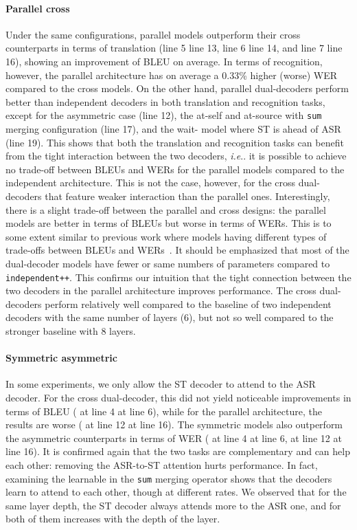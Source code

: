 \documentclass[11pt]{article}
\makeatletter
\DeclareRobustCommand\onedot{\futurelet\@let@token\@onedot}
\def\@onedot{\ifx\@let@token.\else.\null\fi\xspace}
\def\ie{\emph{i.e}\onedot} \def\Ie{\emph{I.e}\onedot}
\theoremstyle{plain}
\theoremstyle{definition}
\newcommand{\var}[1]{\texttt{#1}}
\makeatother
\begin{document}
\paragraph{Parallel \vs cross} Under the same configurations, parallel models outperform their cross counterparts in terms of translation (line 5 \vs line 13, line 6 \vs line 14, and line 7 \vs line 16), showing an improvement of  BLEU on average. In terms of recognition, however, the parallel architecture has on average a 0.33\% higher (worse) WER compared to the cross models. On the other hand, parallel dual-decoders perform better than independent decoders in both translation and recognition tasks, except for the asymmetric case (line 12), the at-self and at-source with \var{sum} merging configuration (line 17), and the wait- model where ST is ahead of ASR (line 19). This shows that both the translation and recognition tasks can benefit from the tight interaction between the two decoders, \ie it is possible to achieve no trade-off between BLEUs and WERs for the parallel models compared to the independent architecture. This is not the case, however, for the cross dual-decoders that feature weaker interaction than the parallel ones. Interestingly, there is a slight trade-off between the parallel and cross designs: the parallel models are better in terms of BLEUs but worse in terms of WERs. This is to some extent similar to previous work where models having different types of trade-offs between BLEUs and WERs~\cite{he2011word,sperber2020consistent,chuang2020worse}. It should be emphasized that most of the dual-decoder models have fewer or same numbers of parameters compared to \var{independent++}. This confirms our intuition that the tight connection between the two decoders in the parallel architecture improves performance. The cross dual-decoders perform relatively well compared to the baseline of two independent decoders with the same number of layers (6), but not so well compared to the 
stronger baseline with 8 layers.

\paragraph{Symmetric \vs asymmetric}
In some experiments, we only allow the ST decoder to attend to the ASR decoder. For the cross dual-decoder, this did not yield {noticeable} improvements in terms of BLEU ( at line 4 \vs  at line 6), while for the parallel architecture, the results are worse ( at line 12 \vs  at line 16). {The symmetric models also outperform the asymmetric counterparts in terms of WER ( at line 4 \vs  at line 6,  at line 12 \vs  at line 16). It is confirmed again that the two tasks are complementary and can help each other: removing the ASR-to-ST attention hurts performance. In fact, examining the learnable  in the \var{sum} merging operator shows that the decoders learn to attend to each other, though at different rates. We observed that for the same layer depth, the ST decoder always attends more to the ASR one, and for both of them  increases with the depth of the layer.}
\end{document}
